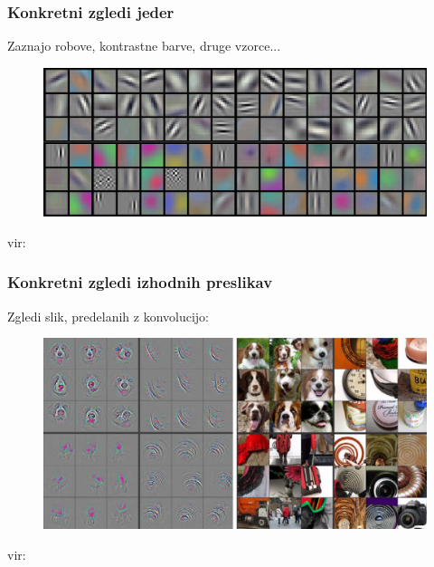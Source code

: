 \documentclass[14pt, t]{beamer}
\begin{document}
\begin{frame}
    \frametitle{Konkretni zgledi jeder}
    
    \vspace{3mm}
    Zaznajo robove, kontrastne barve, druge vzorce...
    \vspace{-2mm}
    \begin{figure}[htb!]
        \centering
        \includegraphics[width=\linewidth]{raster/png-presentation/alexnet}
    \end{figure}
    \vspace{-9mm}
    \hfill {\tiny vir: \cite{alexnet}}
    
\end{frame}

\begin{frame}
    \frametitle{Konkretni zgledi izhodnih preslikav}

    \vspace{3mm}
    Zgledi slik, predelanih z konvolucijo:
    \vspace{-3mm}
    \begin{figure}[htb!]
        \centering
        \includegraphics[width=\linewidth]{raster/png-presentation/dogs}
    \end{figure}
    \vspace{-9mm}
    \hfill {\tiny vir: \cite{zeiler}}
    
\end{frame}
\end{document}

